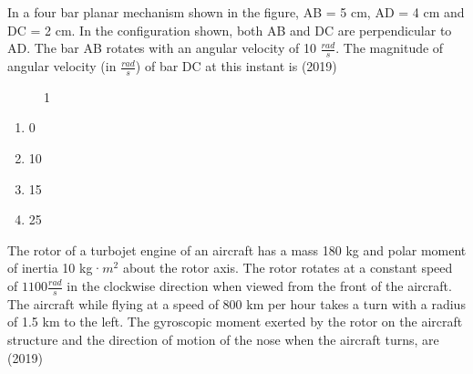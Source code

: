 
\iffalse
\chapter{2019}
\author{AI24BTECH11008}
\section{me}
\fi

    \item In a four bar planar mechanism shown in the figure, AB = 5 cm, AD = 4 cm and DC = 2 cm. In the configuration shown, both AB and DC are perpendicular to AD. The bar AB rotates with an angular velocity of 10 $\frac{rad}{s}$. The magnitude of angular velocity (in $\frac{rad}{s}$) of bar DC at this instant is \hfill (2019)
    \begin{figure}[!ht]
        \centering
        \caption{1}
    \end{figure}
    \begin{enumerate}[label=(\Alph*)]
        \item 0
        \item 10
        \item 15
        \item 25
    \end{enumerate}
    \item The rotor of a turbojet engine of an aircraft has a mass 180 kg and polar moment of inertia 10 kg·$m^2$ about the rotor axis. The rotor rotates at a constant speed of $1100 \frac{rad}{s}$ in the clockwise direction when viewed from the front of the aircraft. The aircraft while flying at a speed of 800 km per hour takes a turn with a radius of 1.5 km to the left. The gyroscopic moment exerted by the rotor on the aircraft structure and the direction of motion of the nose when the aircraft turns, are \hfill (2019)
